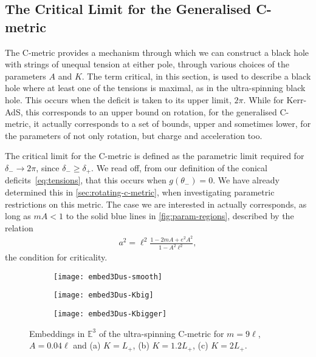 \documentclass[
twoside,
openright,
frontopenright
]{dmathesis}
\begin{document}
\subsection{The Critical Limit for the Generalised C-metric}
\label{sec:critC}

The C-metric provides a mechanism through which we can construct a black hole
with strings of unequal tension at either pole, through various choices of the
parameters $A$ and $K$. The term critical, in this section, is used to describe
a black hole where at least one of the tensions is maximal, as in the
ultra-spinning black hole. This occurs when the deficit is taken to its upper
limit, $2\pi$. While for Kerr-AdS, this corresponds to an upper bound on
rotation, for the generalised C-metric, it actually corresponds to a set of
bounds, upper and sometimes lower, for the parameters of not only rotation, but
charge and acceleration too.

The critical limit for the C-metric is defined as the parametric limit required
for $\delta_- \to 2\pi$, since $\delta_-\geqslant \delta_+$. We read off, from
our definition of the conical deficits~\eqref{eq:tensions}, that this occurs
when $g(\theta_-)=0$. We have already determined this in
\cref{sec:rotating-c-metric}, when investigating parametric restrictions on this
metric. The case we are interested in actually corresponds, as long as $mA < 1$
to the solid blue lines in \cref{fig:param-regions}, described by the relation
\begin{align}\label{eq:us}
a^2 = \ell^2 \frac{1-2mA+e^2A^2}{1-A^2\ell^2},
\end{align}
the condition for criticality.


\begin{figure}
\centering
\begin{subfigure}[b]{0.2\textwidth}
\texttt{[image: embed3Dus-smooth]}
\caption{\label{fig:embed3Dus-smooth}}
\end{subfigure}\qquad
\begin{subfigure}[b]{0.2\textwidth}
\texttt{[image: embed3Dus-Kbig]}
\caption{\label{fig:embed3Dus-Kbig}}
\end{subfigure}\qquad
\begin{subfigure}[b]{0.2\textwidth}
\texttt{[image: embed3Dus-Kbigger]}
\caption{\label{fig:embed3Dus-Kbigger}}
\end{subfigure}
\caption{\label{fig:embed3Dus}Embeddings in $\mathbb{E}^3$ of the ultra-spinning
  C-metric for $m=9\ell$, $A=0.04\ell$ and (a) $K=L_+$, (b) $K=1.2L_+$, (c)
  $K=2L_+$.} 
\end{figure}
\end{document}
